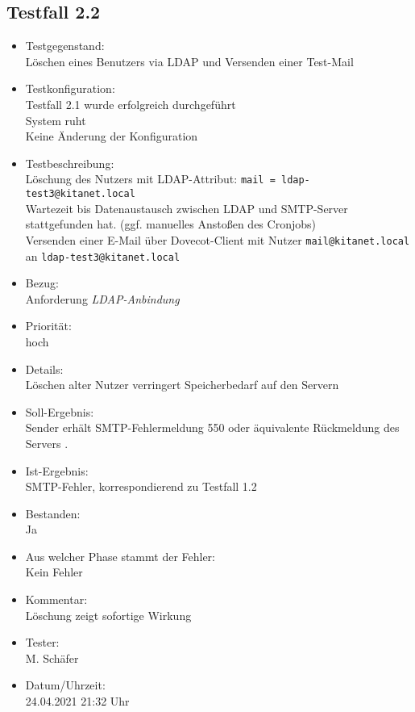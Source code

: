 \subsection{Testfall 2.2}
\begin{itemize}
	\item Testgegenstand:\\
Löschen eines Benutzers via LDAP und Versenden einer Test-Mail
	\item Testkonfiguration:\\
	Testfall 2.1 wurde erfolgreich durchgeführt\\
	System ruht\\
	Keine Änderung der Konfiguration
	\item Testbeschreibung:\\
	Löschung des Nutzers mit LDAP-Attribut: \verb+mail = ldap-test3@kitanet.local+\\
	Wartezeit bis Datenaustausch zwischen LDAP und SMTP-Server stattgefunden hat. (ggf. manuelles Anstoßen des Cronjobs)\\
	Versenden einer E-Mail über Dovecot-Client mit Nutzer \verb+mail@kitanet.local+ \\ an \verb+ldap-test3@kitanet.local+
	\item Bezug:\\
	Anforderung \textit{LDAP-Anbindung}
	\item Priorität:\\
	hoch
	\item Details:\\
	Löschen alter Nutzer verringert Speicherbedarf auf den Servern
	\item Soll-Ergebnis:\\
	Sender erhält SMTP-Fehlermeldung 550 oder äquivalente Rückmeldung des Servers \citep[vgl.][16]{rfc821}.
	\item Ist-Ergebnis:\\
	SMTP-Fehler, korrespondierend zu Testfall 1.2
	\item Bestanden:\\
	Ja
	\item Aus welcher Phase stammt der Fehler:\\
	Kein Fehler
	\item Kommentar:\\
	Löschung zeigt sofortige Wirkung 
	\item Tester:\\
	M. Schäfer
	\item Datum/Uhrzeit:\\
	24.04.2021 21:32 Uhr
\end{itemize}




